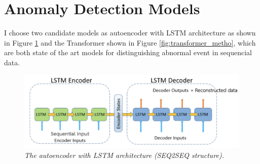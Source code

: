 \section{Anomaly Detection Models}

I choose two candidate models as autoencoder with LSTM architecture as shown in Figure \ref{fig:LSTM_metho} and the Transformer shown in Figure \ref{fig:transformer_metho}, which are both state of the art models for distinguishing abnormal event in sequencial data.

\begin{figure}[H]
  \centering
  \caption[The autoencoder with LSTM architecture (seq2seq structure).]{\emph{The autoencoder with LSTM architecture (SEQ2SEQ structure).}}\label{fig:LSTM_metho}
  \includegraphics[scale = 0.3]{figures/LSTM_metho.jpg}
\end{figure}


